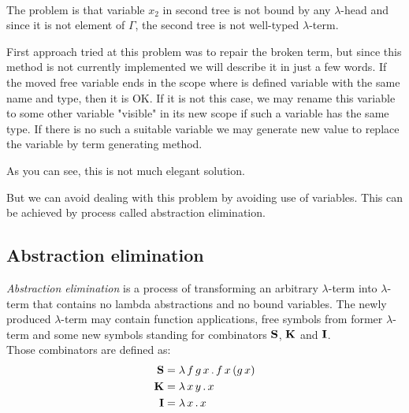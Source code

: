 \documentclass[12pt,a4paper]{report}
\newcommand{\lterm}{$\lambda$-term\xspace}
\begin{document}
~\\The problem is that variable $x_2$ in second tree
is not bound by any $\lambda$-head and since
it is not element of $\Gamma$, the second tree is not well-typed \lterm.  




First approach tried at this problem was to repair the broken term,
but since this method is not currently implemented we will describe it
in just a few words. If the moved free variable ends in the scope 
where is defined variable with the same name and type, then it
is OK. If it is not this case, we may rename this variable to some 
other variable "visible" in its new scope if such a variable has the same 
type. If there is no such a suitable variable we may generate new value 
to replace the variable by term generating method. 

As you can see, this is not much elegant solution. 

But we can avoid dealing with this problem by avoiding use of variables.
This can be achieved by process called abstraction elimination.
 

\subsection{Abstraction elimination}
\label{toSKI}

\textit{Abstraction elimination} is a process of transforming 
an arbitrary \lterm into \lterm that contains no lambda abstractions
and no bound variables.
The newly produced \lterm may contain function applications, 
free symbols from former \lterm and some new symbols standing for 
combinators $\mathbf{S}$, $\mathbf{K}$ and $\mathbf{I}$. \\

Those combinators are defined as:
\begin{align*}
\mathbf{S} &= \lambda \, f\,g\,x \, . \, f\,x\,(g\,x) \\
\mathbf{K} &= \lambda \, x\,y \, . \, x \\
\mathbf{I} &= \lambda \, x \, . \, x 
\end{align*}

\newcommand{\Ae}{\mathop{\mathrm{\AE}}}
\end{document}
